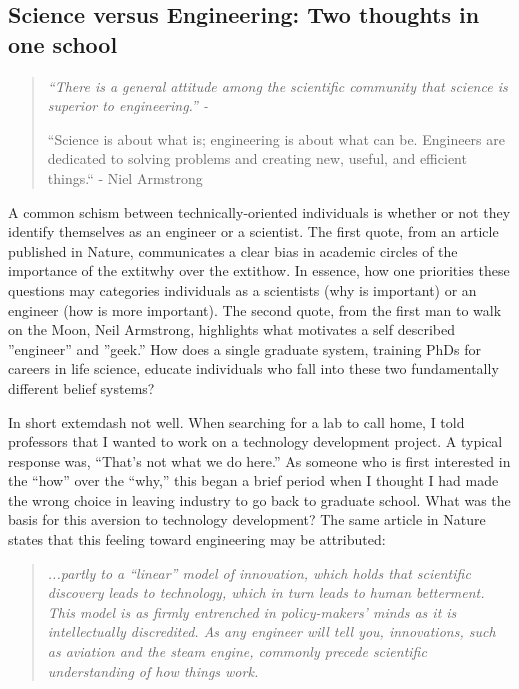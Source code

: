 {{  \subsection{Science versus Engineering: Two thoughts in one school}

    \begin{quote}
      \itshape 
      \singlespacing
        “There is a general attitude among the scientific community that science is superior to engineering.” - \citep{Macilwain2010}

      “Science is about what is; engineering is about what can be. Engineers are dedicated to solving problems and creating new, useful, and efficient things.“ - Niel Armstrong
      \end{quote}

    A common schism between technically-oriented individuals is whether or not they identify themselves as an engineer or a scientist. The first quote, from an article published in Nature, communicates a clear bias in academic circles of the importance of the   extit{why} over the   extit{how}. In essence, how one priorities these questions may categories individuals as a scientists (why is important) or an engineer (how is more important). The second quote, from the first man to walk on the Moon, Neil Armstrong, highlights what motivates a self described ”engineer” and ”geek.” How does a single graduate system, training PhDs for careers in life science, educate individuals who fall into these two fundamentally different belief systems?

    In short  extemdash not well. When searching for a lab to call home, I told professors that I wanted to work on a technology development project. A typical response was, “That's not what we do here.” As someone who is first interested in the ``how'' over the ``why,'' this began a brief period when I thought I had made the wrong choice in leaving industry to go back to graduate school. What was the basis for this aversion to technology development? The same article in Nature states that this feeling toward engineering may be attributed:

    \begin{quote} 
      \itshape 
      \singlespacing
      ...partly to a ``linear'' model of innovation, which holds that scientific discovery leads to technology, which in turn leads to human betterment.  This model is as firmly entrenched in policy-makers' minds as it is intellectually discredited.  As any engineer will tell you, innovations, such as aviation and the steam engine, commonly precede scientific understanding of how things work.
      \end{quote} 

}}

